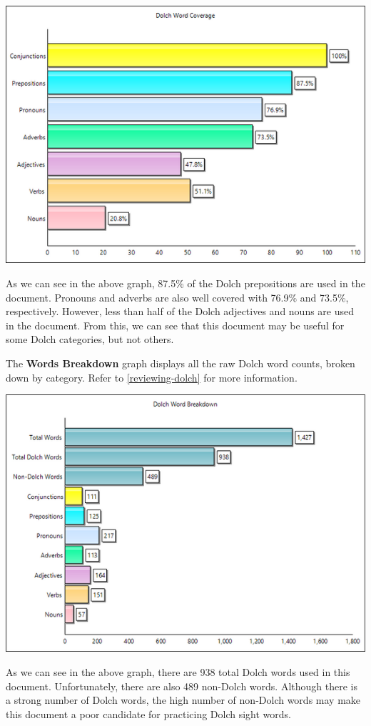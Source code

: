 \documentclass[
]{book}
\theoremstyle{definition}
\theoremstyle{definition}
\theoremstyle{definition}
\theoremstyle{definition}
\theoremstyle{remark}
\begin{document}
\includegraphics{Images/DolchCoverageChart.png}

As we can see in the above graph, 87.5\% of the Dolch prepositions are used in the document. Pronouns and adverbs are also well covered with 76.9\% and 73.5\%, respectively. However, less than half of the Dolch adjectives and nouns are used in the document. From this, we can see that this document may be useful for some Dolch categories, but not others.

The \textbf{Words Breakdown} graph displays all the raw Dolch word counts, broken down by category. Refer to \ref{reviewing-dolch} for more information.

\includegraphics{Images/DolchWordBreakdown.png}

As we can see in the above graph, there are 938 total Dolch words used in this document. Unfortunately, there are also 489 non-Dolch words. Although there is a strong number of Dolch words, the high number of non-Dolch words may make this document a poor candidate for practicing Dolch sight words.
\end{document}
